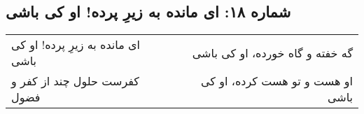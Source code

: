\begin{center}
\section*{شماره ۱۸: ای مانده به زیرِ پرده! او کی باشی}
\label{sec:018}
\begin{longtable}{l p{0.5cm} r}
ای مانده به زیرِ پرده! او کی باشی
&&
گه خفته و گاه خورده، او کی باشی
\\
کفرست حلول چند از کفر و فضول
&&
او هست و تو هست کرده، او کی باشی
\\
\end{longtable}
\end{center}
